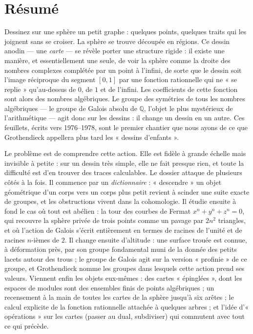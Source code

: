 \documentclass[11pt,a4paper]{article}
\begin{document}
\section*{Résumé}

\begin{resume}
Dessinez sur une sphère un petit graphe : quelques points, quelques traits qui
les joignent sans se croiser. La sphère se trouve découpée en régions. Ce
dessin anodin --- une \emph{carte} --- se révèle porter une structure rigide :
il existe une manière, et essentiellement une seule, de voir la sphère comme
la droite des nombres complexes complétée par un point à l'infini, de sorte que
le dessin soit l'image réciproque du segment $[0,1]$ par une fonction
rationnelle qui ne « se replie » qu'au-dessus de $0$, de $1$ et de l'infini. Les
coefficients de cette fonction sont alors des nombres algébriques. Le groupe
des symétries de tous les nombres algébriques --- le groupe de Galois absolu
de $\mathbb{Q}$, l'objet le plus mystérieux de l'arithmétique --- agit donc sur
les dessins : il change un dessin en un autre. Ces feuillets, écrits vers
1976--1978, sont le premier chantier que nous ayons de ce que Grothendieck
appellera plus tard les « dessins d'enfants ».

Le problème est de comprendre cette action. Elle est fidèle à grande échelle
mais invisible à petite : sur un dessin très simple, elle ne fait presque
rien, et toute la difficulté est d'en trouver des traces calculables. Le
dossier attaque de plusieurs côtés à la fois. Il commence par un
\emph{dictionnaire} : « descendre » un objet géométrique d'un corps vers un
corps plus petit revient à scinder une suite exacte de groupes, et les
obstructions vivent dans la cohomologie. Il étudie ensuite à fond le cas où
tout est abélien : la tour des courbes de Fermat $x^n + y^n + z^n = 0$, qui
recouvre la sphère privée de trois points comme un pavage par $2n^2$
triangles, et où l'action de Galois s'écrit entièrement en termes de racines
de l'unité et de racines $n$-ièmes de $2$. Il change ensuite d'altitude : une
surface trouée est connue, à déformation près, par son groupe fondamental muni
de la donnée des petits lacets autour des trous ; le groupe de Galois agit sur
la version « profinie » de ce groupe, et Grothendieck nomme les groupes dans
lesquels cette action prend ses valeurs. Viennent enfin les objets eux-mêmes :
des cartes « épinglées », dont les espaces de modules sont des ensembles finis
de points algébriques ; un recensement à la main de toutes les cartes de la
sphère jusqu'à six arêtes ; le calcul explicite de la fonction rationnelle
attachée à quelques arbres ; et l'idée d'« opérations » sur les cartes (passer
au dual, subdiviser) qui commutent avec tout ce qui précède.


\end{resume}
\end{document}
